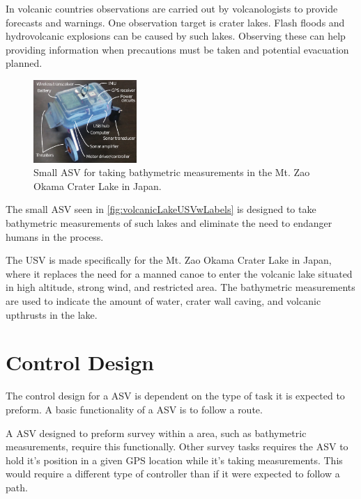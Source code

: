 In volcanic countries observations are carried out by volcanologists to provide forecasts and warnings. One observation target is crater lakes. Flash floods and hydrovolcanic explosions can be caused by such lakes. Observing these can help providing information when precautions must be taken and potential evacuation planned.\cite{AWatanabe}
%
\begin{figure}[H]
  \includegraphics[width=0.35\textwidth]{figures/volcanicLakeUSVwLabels.pdf}
  \caption{Small ASV for taking bathymetric measurements in the Mt. Zao Okama Crater Lake in Japan.\cite{AWatanabe}}
  \label{fig:volcanicLakeUSVwLabels}
\end{figure}
\vspace{-6mm}
%
The small ASV seen in \autoref{fig:volcanicLakeUSVwLabels} is designed to take bathymetric measurements of such lakes and eliminate the need to endanger humans in the process.\cite{AWatanabe}

The USV is made specifically for the Mt. Zao Okama Crater Lake in Japan, where it replaces the need for a manned canoe to enter the volcanic lake situated in high
altitude, strong wind, and restricted area. The bathymetric measurements are used to indicate the amount of water, crater wall caving, and volcanic upthrusts in the lake.\cite{AWatanabe}

\section{Control Design}
The control design for a ASV is dependent on the type of task it is expected to preform. 
A basic functionality of a ASV is to follow a route. 

A ASV designed to preform survey within a area, such as bathymetric measurements, require this functionally. 
Other survey tasks requires the ASV to hold it's position in a given GPS location while it's taking measurements. 
This would require a different type of controller than if it were expected to follow a path. 






